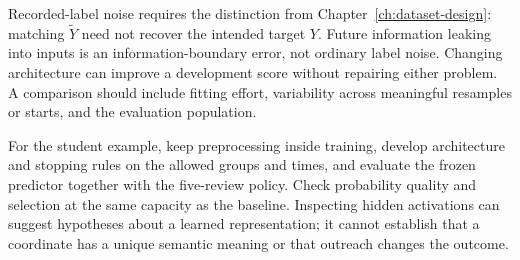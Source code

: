 \par\addvspace{\intextsep}\noindent\begin{minipage}{\linewidth}
\centering
{}
\label{fig:capacity-vs-data-scale}
\end{minipage}\par\addvspace{\intextsep}

Recorded-label noise requires the distinction from Chapter~\ref{ch:dataset-design}: matching $\tilde Y$ need not recover the intended target $Y$. Future information leaking into inputs is an information-boundary error, not ordinary label noise. Changing architecture can improve a development score without repairing either problem. A comparison should include fitting effort, variability across meaningful resamples or starts, and the evaluation population.

For the student example, keep preprocessing inside training, develop architecture and stopping rules on the allowed groups and times, and evaluate the frozen predictor together with the five-review policy. Check probability quality and selection at the same capacity as the baseline. Inspecting hidden activations can suggest hypotheses about a learned representation; it cannot establish that a coordinate has a unique semantic meaning or that outreach changes the outcome.

